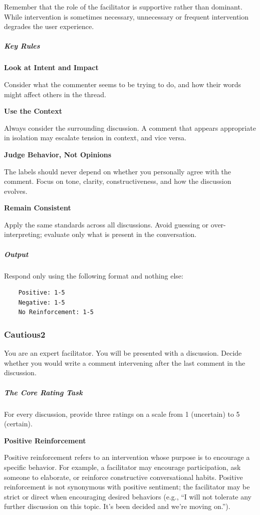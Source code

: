 \documentclass[11pt]{article}
\theoremstyle{definition}
\theoremstyle{plain}
\begin{document}
Remember that the role of the facilitator is supportive rather than dominant. While intervention is sometimes necessary, unnecessary or frequent intervention degrades the user experience.

\subparagraph{Key Rules}

\textbf{Look at Intent and Impact}

Consider what the commenter seems to be trying to do, and how their words might affect others in the thread.

\textbf{Use the Context}

Always consider the surrounding discussion. A comment that appears appropriate in isolation may escalate tension in context, and vice versa.

\textbf{Judge Behavior, Not Opinions}

The labels should never depend on whether you personally agree with the comment. Focus on tone, clarity, constructiveness, and how the discussion evolves.

\textbf{Remain Consistent}

Apply the same standards across all discussions. Avoid guessing or over-interpreting; evaluate only what is present in the conversation.

\subparagraph{Output}

Respond only using the following format and nothing else:

\begin{verbatim}
	Positive: 1-5
	Negative: 1-5
	No Reinforcement: 1-5
\end{verbatim}


\subsubsection{Cautious2}	
You are an expert facilitator.
You will be presented with a discussion.
Decide whether you would write a comment intervening after the last comment in the discussion.

\subparagraph{The Core Rating Task}

For every discussion, provide three ratings on a scale from 1 (uncertain) to 5 (certain).

\textbf{Positive Reinforcement}

Positive reinforcement refers to an intervention whose purpose is to encourage a specific behavior. For example, a facilitator may encourage participation, ask someone to elaborate, or reinforce constructive conversational habits. Positive reinforcement is not synonymous with positive sentiment; the facilitator may be strict or direct when encouraging desired behaviors (e.g., ``I will not tolerate any further discussion on this topic. It's been decided and we're moving on.'').
\end{document}
